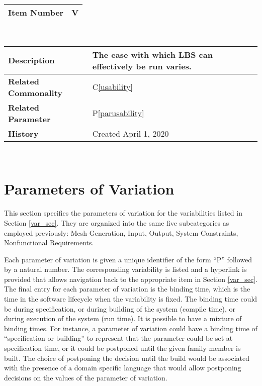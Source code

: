\documentclass[12pt]{article}
\newcommand{\colCwidth}{0.28\textwidth}
\newcommand{\colDwidth}{0.72\textwidth}
\newcommand{\cref}[1]{C\ref{#1}}
\newcounter{varnum} %
\newcommand{\pref}[1]{P\ref{#1}}
\begin{document}
\noindent
\begin{minipage}{\textwidth}
	\renewcommand*{\arraystretch}{1.5}
	\begin{tabular}{| p{\colCwidth} | p{\colDwidth}|}
		\hline
		\bf Item Number& V{varnum}\thevarnum\label{varusability} \\
		\hline
	\end{tabular}\\
	
	\begin{tabular}{| p{\colCwidth} | p{\colDwidth}|}		
		\hline
		\bf Description & The ease with which LBS can effectively be run varies.\\
		\hline
		\bf Related Commonality & \cref{usability}\\
		\hline
		\bf Related Parameter & \pref{parusability}\\
		\hline
		\bf History & Created April 1, 2020\\
		\hline
	\end{tabular}
\end{minipage}\\
\newpage
\section{Parameters of Variation}
This section specifies the parameters of variation for the variabilities listed in Section \ref{var_sec}. They are organized into the same five subcategories as employed previously: Mesh Generation, Input, Output, System Constraints, Nonfunctional Requirements. 

Each parameter of variation is given a unique identifier of the form “P” followed by a natural number. The corresponding variability is listed and a hyperlink is provided that allows navigation back to the appropriate item in Section \ref{var_sec}. The final entry for each parameter of variation is the binding time, which is the time in the software lifecycle when the variability is fixed. The binding time could be during specification, or during building
of the system (compile time), or during execution of the system (run time). It is possible to have a mixture of binding times. For instance, a parameter of variation could have a binding time of “specification or building” to represent that the parameter could be set at specification time, or it could be postponed until the given family member is built. The choice of postponing the decision until the build would be associated with the presence of a domain specific language that would allow postponing decisions on the values of the parameter of variation.
\end{document}
